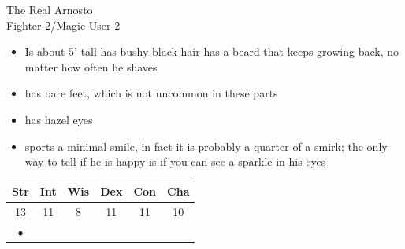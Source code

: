 \documentclass[11pt]{article}
\begin{document}
\hspace{0.4cm}
\begin{minipage}{0.55\textwidth}%
    \Huge{\Fontauri The Real Arnosto} \\
    \Large{Fighter 2/Magic User 2} \\
    \begin{normalsize}
        \begin{itemize}[topsep=0pt, itemsep=0pt, partopsep=0pt, parsep=0pt, leftmargin=*]
            \item Is about 5’ tall has bushy black hair has a beard that keeps growing back, no matter how often he shaves
            \item has bare feet, which is not uncommon in these parts
            \item has hazel eyes
            \item sports a minimal smile, in fact it is probably a quarter of a smirk; the only way to tell if he is happy is if you can see a sparkle in his eyes
        \end{itemize}
    \end{normalsize}
    \begin{large}
        \vspace{0.4cm}
        \begin{tabular}{cccccc}
            Str & Int & Wis & Dex & Con & Cha \\ \hline
            13 & 11 & 8 & 11 & 11 & 10\\ 
            $\bullet$ & & & & & 
        \end{tabular}
    \end{large}
    \vspace{0.4cm}


\end{minipage}
\end{document}

